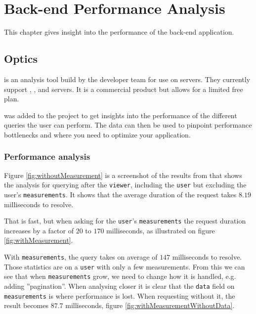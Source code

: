 \chapter{Back-end Performance Analysis}
This chapter gives insight into the performance of the back-end application.

\section{Optics}
 is an analysis tool build by the  developer team for use on  servers. 
They currently support , ,  and  servers. 
It is a commercial product but allows for a limited free plan.

 was added to the project to get insights into the performance of the different queries the user can perform. 
The data can then be used to pinpoint performance bottlenecks and where you need to optimize your application.

\subsection{Performance analysis}
Figure \ref{fig:withoutMeasurement} is a screenshot of the results from  that shows the analysis for querying after the \verb+viewer+, including the \verb+user+ but excluding the user's \verb+measurements+. 
It shows that the average duration of the request takes $8.19$ milliseconds to resolve. 


That is fast, but when asking for the \verb+user+'s \verb+measurements+ the request duration increases by a factor of $20$ to $170$ milliseconds, as illustrated on figure \ref{fig:withMeasurement}.


With \verb+measurements+, the query takes on average of $147$ milliseconds to resolve.
Those statistics are on a \verb+user+ with only a few measurements.
From this we can see that when \verb+measurements+ grow, we need to change how it is handled, e.g. adding ''pagination''. 
When analysing closer it is clear that the \verb+data+ field on \verb+measurements+ is where performance is lost.
When requesting without it, the result becomes $87.7$ milliseconds, figure \ref{fig:withMeasurementWithoutData}.

